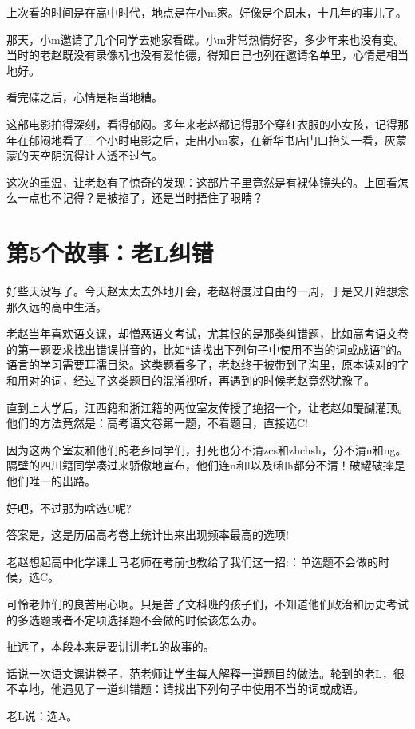 \documentclass[openany]{ctexbook}
\begin{document}
上次看的时间是在高中时代，地点是在小m家。好像是个周末，十几年的事儿了。

那天，小m邀请了几个同学去她家看碟。小m非常热情好客，多少年来也没有变。当时的老赵既没有录像机也没有爱怕德，得知自己也列在邀请名单里，心情是相当地好。

看完碟之后，心情是相当地糟。

这部电影拍得深刻，看得郁闷。多年来老赵都记得那个穿红衣服的小女孩，记得那年在郁闷地看了三个小时电影之后，走出小m家，在新华书店门口抬头一看，灰蒙蒙的天空阴沉得让人透不过气。

这次的重温，让老赵有了惊奇的发现：这部片子里竟然是有裸体镜头的。上回看怎么一点也不记得？是被掐了，还是当时捂住了眼睛？

\chapter*{第5个故事：老L纠错}\label{l5}

好些天没写了。今天赵太太去外地开会，老赵将度过自由的一周，于是又开始想念那久远的高中生活。

老赵当年喜欢语文课，却憎恶语文考试，尤其恨的是那类纠错题，比如高考语文卷的第一题要求找出错误拼音的，比如``请找出下列句子中使用不当的词或成语''的。语言的学习需要耳濡目染。这类题看多了，老赵终于被带到了沟里，原本读对的字和用对的词，经过了这类题目的混淆视听，再遇到的时候老赵竟然犹豫了。

直到上大学后，江西籍和浙江籍的两位室友传授了绝招一个，让老赵如醍醐灌顶。他们的方法竟然是：高考语文卷第一题，不看题目，直接选C!

因为这两个室友和他们的老乡同学们，打死也分不清zcs和zhchsh，分不清n和ng。隔壁的四川籍同学凑过来骄傲地宣布，他们连n和l以及f和h都分不清！破罐破摔是他们唯一的出路。

好吧，不过那为啥选C呢?

答案是，这是历届高考卷上统计出来出现频率最高的选项!

老赵想起高中化学课上马老师在考前也教给了我们这一招:：单选题不会做的时候，选C。

可怜老师们的良苦用心啊。只是苦了文科班的孩子们，不知道他们政治和历史考试的多选题或者不定项选择题不会做的时候该怎么办。

扯远了，本段本来是要讲讲老L的故事的。

话说一次语文课讲卷子，范老师让学生每人解释一道题目的做法。轮到的老L，很不幸地，他遇见了一道纠错题：请找出下列句子中使用不当的词或成语。

老L说：选A。
\end{document}
